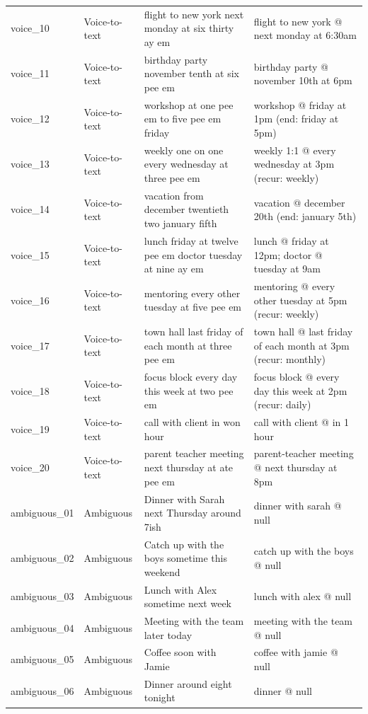 \begin{longtable}{@{}p{2.2cm}p{2.1cm}p{5cm}p{5cm}@{}}
voice\_10 & Voice-to-text & flight to new york next monday at six thirty ay em & flight to new york @ next monday at 6:30am \\
voice\_11 & Voice-to-text & birthday party november tenth at six pee em & birthday party @ november 10th at 6pm \\
voice\_12 & Voice-to-text & workshop at one pee em to five pee em friday & workshop @ friday at 1pm (end: friday at 5pm) \\
voice\_13 & Voice-to-text & weekly one on one every wednesday at three pee em & weekly 1:1 @ every wednesday at 3pm (recur: weekly) \\
voice\_14 & Voice-to-text & vacation from december twentieth two january fifth & vacation @ december 20th (end: january 5th) \\
voice\_15 & Voice-to-text & lunch friday at twelve pee em doctor tuesday at nine ay em & lunch @ friday at 12pm; doctor @ tuesday at 9am \\
voice\_16 & Voice-to-text & mentoring every other tuesday at five pee em & mentoring @ every other tuesday at 5pm (recur: weekly) \\
voice\_17 & Voice-to-text & town hall last friday of each month at three pee em & town hall @ last friday of each month at 3pm (recur: monthly) \\
voice\_18 & Voice-to-text & focus block every day this week at two pee em & focus block @ every day this week at 2pm (recur: daily) \\
voice\_19 & Voice-to-text & call with client in won hour & call with client @ in 1 hour \\
voice\_20 & Voice-to-text & parent teacher meeting next thursday at ate pee em & parent-teacher meeting @ next thursday at 8pm \\
ambiguous\_01 & Ambiguous & Dinner with Sarah next Thursday around 7ish & dinner with sarah @ null \\
ambiguous\_02 & Ambiguous & Catch up with the boys sometime this weekend & catch up with the boys @ null \\
ambiguous\_03 & Ambiguous & Lunch with Alex sometime next week & lunch with alex @ null \\
ambiguous\_04 & Ambiguous & Meeting with the team later today & meeting with the team @ null \\
ambiguous\_05 & Ambiguous & Coffee soon with Jamie & coffee with jamie @ null \\
ambiguous\_06 & Ambiguous & Dinner around eight tonight & dinner @ null \\

\end{longtable}
